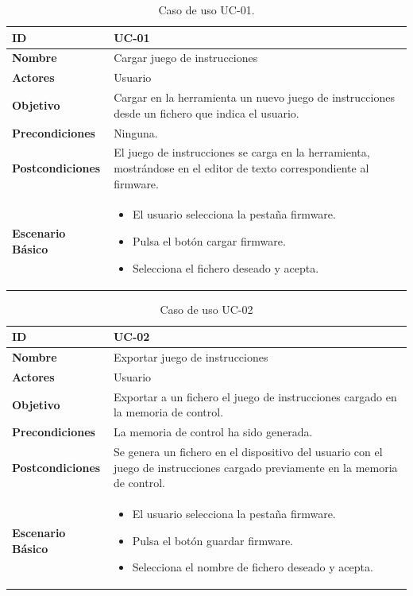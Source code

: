 \begin{center}
\begin{table}[htbp]
\centering
\caption{Caso de uso UC-01.}
\begin{tabular}{@{}p{2.5cm} p{9cm}@{}} 
\toprule
\textbf{ID}	& UC-01  \\
\midrule
\textbf{Nombre} 		& Cargar juego de instrucciones   \\
\midrule
\textbf{Actores} 		&	Usuario  \\
\midrule
\textbf{Objetivo} 	&	Cargar en la herramienta un nuevo juego de instrucciones desde un fichero que indica el usuario. 	 \\
\midrule
\textbf{Precondiciones}	&	Ninguna.   \\
\midrule
\textbf{Postcondiciones} 	&	El juego de instrucciones se carga en la herramienta, mostrándose en el editor de texto correspondiente al firmware.   \\
\midrule
\textbf{Escenario Básico} 	&  \begin{itemize}
\item El usuario selecciona la pestaña firmware.
\item Pulsa el botón cargar firmware.
\item Selecciona el fichero deseado y acepta.
\end{itemize} \\
\bottomrule
\end{tabular}
\label{tab:uc01}
\end{table}
\end{center}


\begin{center}
\begin{table}[htbp]
\centering
\caption{Caso de uso UC-02}
\begin{tabular}{@{}p{2.5cm} p{9cm}@{}} 
\toprule
\textbf{ID}	& UC-02  \\
\midrule
\textbf{Nombre} 		& Exportar juego de instrucciones   \\
\midrule
\textbf{Actores} 		&	Usuario  \\
\midrule
\textbf{Objetivo} 	&	Exportar a un fichero el juego de instrucciones cargado en la memoria de control. 	 \\
\midrule
\textbf{Precondiciones}	&	La memoria de control ha sido generada.   \\
\midrule
\textbf{Postcondiciones} 	& Se genera un fichero en el dispositivo del usuario con el juego de instrucciones cargado previamente en la memoria de control.   \\
\midrule
\textbf{Escenario Básico} 	&  \begin{itemize}
\item El usuario selecciona la pestaña firmware.
\item Pulsa el botón guardar firmware.
\item Selecciona el nombre de fichero deseado y acepta.
\end{itemize} \\
\bottomrule
\end{tabular}
\label{tab:uc02}
\end{table}
\end{center}

